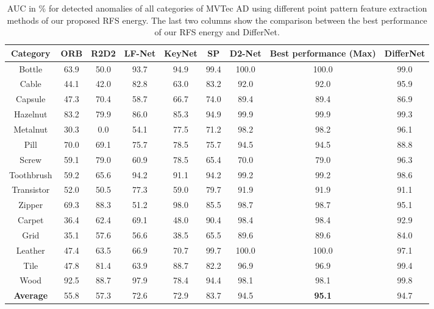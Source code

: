 \documentclass[journal]{IEEEtran}
\let\MYoriglatexcaption\caption
\renewcommand{\caption}[2][\relax]{\MYoriglatexcaption[#2]{#2}}
\begin{document}
\begin{table*}[!htbp]
	\centering
	\caption{AUC in \% for detected anomalies of all categories of MVTec AD using different point pattern feature extraction methods of our proposed RFS energy. The last two columns show the comparison between the best performance of our RFS energy and DifferNet.}
	\label{Tab:ablation_study}
	\begin{tabular}{ccccccccc}
		    \toprule
		Category &ORB &R2D2&LF-Net&KeyNet &SP &D2-Net&Best performance (Max) &DifferNet\cite{rudolph2021same} \\
		\hline
		Bottle & 63.9  & 50.0  & 93.7  & 94.9  & 99.4  & 100.0 & 100.0& 99.0  \\
		Cable & 44.1  & 42.0  & 82.8  & 63.0  & 83.2  & 92.0  & 92.0  & 95.9 \\
		Capsule & 47.3  & 70.4  & 58.7  & 66.7  & 74.0  & 89.4  & 89.4  & 86.9 \\
		Hazelnut & 83.2  & 79.9  & 86.0  & 85.3  & 94.9  & 99.9  & 99.9  & 99.3 \\
		Metalnut & 30.3  & 0.0   & 54.1  & 77.5  & 71.2  & 98.2  & 98.2  & 96.1 \\
		Pill  & 70.0  & 69.1  & 75.7  & 78.5  & 75.7  & 94.5  & 94.5  & 88.8 \\
		Screw & 59.1  & 79.0  & 60.9  & 78.5  & 65.4  & 70.0  & 79.0  & 96.3 \\
		Toothbrush & 59.2  & 65.6  & 94.2  & 91.1  & 94.2  & 99.2  & 99.2  & 98.6 \\
		Transistor & 52.0  & 50.5 & 77.3  & 59.0  & 79.7  & 91.9  & 91.9  & 91.1 \\
		Zipper & 69.3  & 88.3  & 51.2  & 98.0  & 85.5  & 98.7  & 98.7  & 95.1 \\
		\hline
		Carpet & 36.4  & 62.4  & 69.1  & 48.0  & 90.4  & 98.4  & 98.4  & 92.9 \\
		Grid  & 35.1  & 57.6  & 56.6  & 38.5  & 65.5  & 89.6  & 89.6  & 84.0 \\
		Leather & 47.4  & 63.5  & 66.9  & 70.7  & 99.7  & 100.0 & 100.0 & 97.1 \\
		Tile  & 47.8  & 81.4  & 63.9  & 88.7  & 82.2  & 96.9  & 96.9  & 99.4 \\
		Wood  & 92.5  & 88.7  & 97.9  & 78.4  & 94.4  & 98.1  & 98.1  & 99.8 \\
		\hline
		\textbf{Average} & 55.8  & 57.3  & 72.6  & 72.9  & 83.7  & 94.5  & \textbf{95.1}  &94.7 \\
		    \toprule
	\end{tabular}\label{tab:addlabel}\end{table*}
\end{document}
